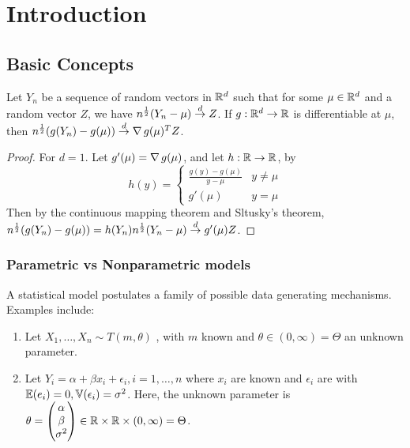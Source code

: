 \chapter{Introduction}
\label{cha:introduction}

\section{Basic Concepts}
\label{sec:basic-concepts}

\begin{thm}
  Let $Y_{n}$ be a sequence of random vectors in $\mathbb{R}^{d}$ such that
  for some $\mu \in \mathbb{R}^{d}$ and a random vector $Z$, we have
  $n^{\frac{1}{2}}(Y_{n} - \mu) \overset{d}{\rightarrow} Z$.  If $g: \mathbb{R}^{d} \rightarrow \mathbb{R}$
  is differentiable at $\mu$, then $n^{\frac{1}{2}}(g(Y_{n}) - g(\mu))
  \overset{d}{\rightarrow} \operatorname*{\nabla} g(\mu)^{T} Z$.
\end{thm}
\begin{proof}
  For $d = 1$.  Let $g'(\mu) = \operatorname*{\nabla} g(\mu)$, and let $h: \mathbb{R}
  \rightarrow \mathbb{R}$, by
  \begin{equation}
    \label{eq:134}
    h(y) =
    \begin{cases}
      \frac{g(y) - g(\mu)}{y - \mu}  & y \neq \mu \\
      g'(\mu) & y = \mu
    \end{cases}
  \end{equation}  Then by the continuous mapping theorem and Sltusky's
  theorem, $n^{\frac{1}{2}}(g(Y_{n}) - g(\mu)) = h(Y_{n})
  n^{\frac{1}{2}}(Y_{n} - \mu) \overset{d}{\rightarrow} g'(\mu) Z$.
\end{proof}

\subsection{Parametric vs Nonparametric models}
\label{sec:param-vs-nonp}

A statistical model postulates a family of possible data generating
mechanisms.  Examples include:
\begin{enumerate}
\item Let $X_{1}, \dots, X_{n} \sim T(m, \theta)$ \iid, with $m$ known
  and $\theta \in (0, \infty) = \Theta$ an unknown parameter.
\item Let $Y_{i} = \alpha + \beta x_{i}+ \epsilon_{i}, i = 1, \dots,
  n$ where $x_{i}$ are known and $\epsilon_{i}$ are \iid with
  $\E{e_{i}} = 0, \Var{\epsilon_{i}} = \sigma^{2}$.  Here, the unknown
  parameter is $\theta =
  \begin{pmatrix}
    \alpha \\
    \beta \\
    \sigma^{2}
  \end{pmatrix} \in \mathbb{R} \times \mathbb{R} \times (0, \infty) = \Theta$.
\end{enumerate}

